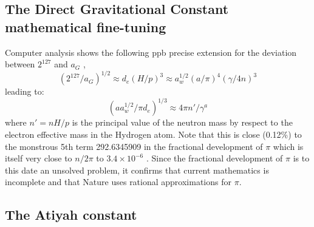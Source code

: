 \documentclass[twoside,draft]{article}
\begin{document}
\begin{sloppypar}
{\subsection {The Direct Gravitational Constant mathematical fine-tuning}

Computer analysis shows the following ppb precise extension for the deviation between $2^{127}$ and
$a_{G}$ ,
\begin{equation}
(2^{127} / a_{G})^{1/2} \approx d_{e} (H/p)^{3} \approx a_{w}^{1/2} (a/\pi)^{4} ( \gamma/4n)^{3}
\end{equation}
leading to:
\begin{equation}
(aa_{w}^{1/2} /\pi d_{e})^{1/3} \approx 4\pi n\prime/ \gamma^{a}
\end{equation}
where $n\prime = nH/p$ is the principal value of the neutron mass by respect to the electron effective mass
in the Hydrogen atom. Note that this is close (0.12\%) to the monstrous 5th term 292.6345909 in
the fractional development of $\pi$ which is itself very close to $n/2\pi$ to $3.4 \times 10^{-6}$ . Since the fractional
development of $\pi$ is to this date an unsolved problem, it confirms that current mathematics is
incomplete and that Nature uses rational approximations for $\pi$.

\subsection {The Atiyah constant}

}
\end{sloppypar}
\end{document}
